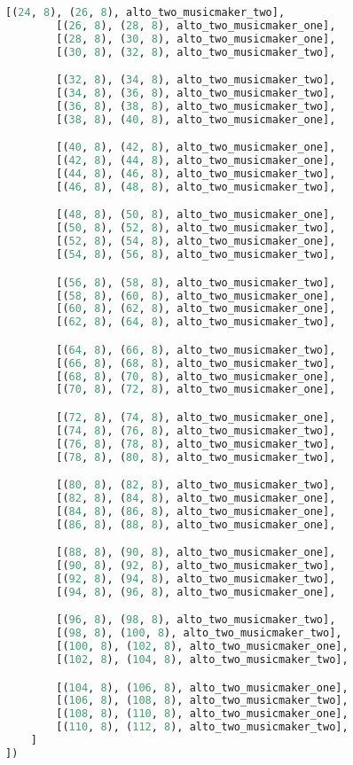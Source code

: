 \begin{lstlisting}[language=Python, caption=Invocation Source Code]
        [(24, 8), (26, 8), alto_two_musicmaker_two],
        [(26, 8), (28, 8), alto_two_musicmaker_one],
        [(28, 8), (30, 8), alto_two_musicmaker_one],
        [(30, 8), (32, 8), alto_two_musicmaker_two],

        [(32, 8), (34, 8), alto_two_musicmaker_two],
        [(34, 8), (36, 8), alto_two_musicmaker_two],
        [(36, 8), (38, 8), alto_two_musicmaker_two],
        [(38, 8), (40, 8), alto_two_musicmaker_one],

        [(40, 8), (42, 8), alto_two_musicmaker_one],
        [(42, 8), (44, 8), alto_two_musicmaker_one],
        [(44, 8), (46, 8), alto_two_musicmaker_two],
        [(46, 8), (48, 8), alto_two_musicmaker_two],

        [(48, 8), (50, 8), alto_two_musicmaker_one],
        [(50, 8), (52, 8), alto_two_musicmaker_two],
        [(52, 8), (54, 8), alto_two_musicmaker_one],
        [(54, 8), (56, 8), alto_two_musicmaker_two],

        [(56, 8), (58, 8), alto_two_musicmaker_two],
        [(58, 8), (60, 8), alto_two_musicmaker_one],
        [(60, 8), (62, 8), alto_two_musicmaker_one],
        [(62, 8), (64, 8), alto_two_musicmaker_two],

        [(64, 8), (66, 8), alto_two_musicmaker_two],
        [(66, 8), (68, 8), alto_two_musicmaker_two],
        [(68, 8), (70, 8), alto_two_musicmaker_one],
        [(70, 8), (72, 8), alto_two_musicmaker_one],

        [(72, 8), (74, 8), alto_two_musicmaker_one],
        [(74, 8), (76, 8), alto_two_musicmaker_two],
        [(76, 8), (78, 8), alto_two_musicmaker_two],
        [(78, 8), (80, 8), alto_two_musicmaker_two],

        [(80, 8), (82, 8), alto_two_musicmaker_two],
        [(82, 8), (84, 8), alto_two_musicmaker_one],
        [(84, 8), (86, 8), alto_two_musicmaker_one],
        [(86, 8), (88, 8), alto_two_musicmaker_one],

        [(88, 8), (90, 8), alto_two_musicmaker_one],
        [(90, 8), (92, 8), alto_two_musicmaker_two],
        [(92, 8), (94, 8), alto_two_musicmaker_two],
        [(94, 8), (96, 8), alto_two_musicmaker_one],

        [(96, 8), (98, 8), alto_two_musicmaker_two],
        [(98, 8), (100, 8), alto_two_musicmaker_two],
        [(100, 8), (102, 8), alto_two_musicmaker_one],
        [(102, 8), (104, 8), alto_two_musicmaker_two],

        [(104, 8), (106, 8), alto_two_musicmaker_one],
        [(106, 8), (108, 8), alto_two_musicmaker_two],
        [(108, 8), (110, 8), alto_two_musicmaker_one],
        [(110, 8), (112, 8), alto_two_musicmaker_two],
    ]
])


\end{lstlisting}
